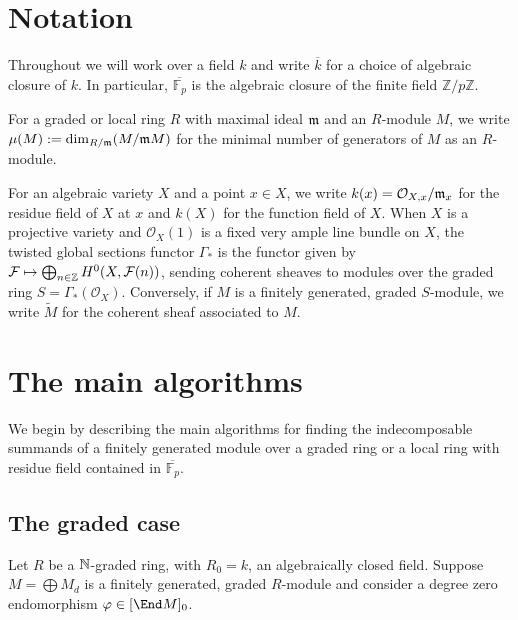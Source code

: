 \documentclass[12pt]{article}
\let\wtilde\widetilde
\def\cF{\mathcal F}
\def\OO{\mathcal O}
\def\FF{\mathbb F}
\def\ZZ{\mathbb Z}
\theoremstyle{theorem}
\numberwithin{thm}{section}
\theoremstyle{definition}
\newcommand{\mahrud}[1]{{\color{ForestGreen} \sf $\blacklozenge$ Mahrud: [#1]}}
\begin{document}
\section{Notation}

Throughout we will work over a field $k$ and write $\overline k$ for a choice of algebraic closure of $k$. \linebreak In particular, $\overline{\FF_p}$ is the algebraic closure of the finite field $\ZZ/p\ZZ$.

For a graded or local ring $R$ with maximal ideal $\mathfrak m$ and an $R$-module $M$, we write $\mu(M):=\dim_{R/\mathfrak m}(M/\mathfrak m M)$ for the minimal number of generators of $M$ as an $R$-module.

For an algebraic variety $X$ and a point $x\in X$, we write $k(x)=\OO_{X,x}/\m_x$ for the residue field of $X$ at $x$ and $k(X)$ for the function field of $X$.
%
When $X$ is a projective variety and $\OO_X(1)$ is a fixed very ample line bundle on $X$, the twisted global sections functor $\Gamma_*$ is the functor given by $\cF \mapsto \bigoplus_{n\in \Z} H^0(X, \cF(n))$, sending coherent sheaves to modules over the graded ring $S = \Gamma_*(\OO_X)$. Conversely, if $M$ is a finitely generated, graded $S$-module, we write $\wtilde M$ for the coherent sheaf associated to $M$.

\section{The main algorithms}

We begin by describing the main algorithms for finding the indecomposable summands of a finitely generated module over a graded ring or a local ring with residue field contained in $\overline{\FF_p}$.

\subsection{The graded case}\label{sec:graded-alg}

Let $R$ be a $\mathbb N$-graded ring, with $R_0 = k$, an algebraically closed field.
Suppose $M = \bigoplus M_d$ is a finitely generated, graded $R$-module and consider a degree zero endomorphism $\phi \in [\End M]_0$.
\end{document}
